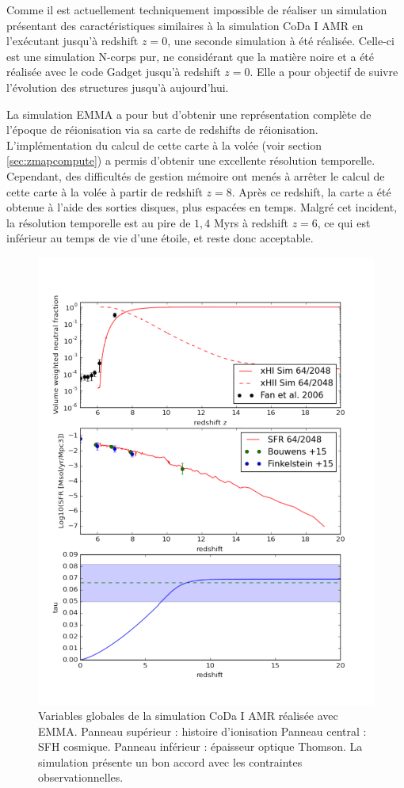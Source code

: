 Comme il est actuellement techniquement impossible de réaliser un simulation présentant des caractéristiques similaires à la simulation \ac{CoDa} I \ac{AMR} en l'exécutant jusqu’à redshift $z=0$, une seconde simulation à été réalisée.
Celle-ci est une simulation N-corps pur, ne considérant que la matière noire et a été réalisée avec le code Gadget \citep{springel_cosmological_2005} jusqu'à redshift $z=0$.
Elle a pour objectif de suivre l'évolution des structures jusqu'à aujourd'hui.

La simulation EMMA a pour but d'obtenir une représentation complète de l'époque de réionisation via sa carte de redshifts de réionisation.
L'implémentation du calcul de cette carte à la volée (voir section \ref{sec:zmapcompute}) a permis d'obtenir une excellente résolution temporelle.
Cependant, des difficultés de gestion mémoire ont menés à arrêter le calcul de cette carte à la volée à partir de redshift $z=8$.
Après ce redshift, la carte a été obtenue à l'aide des sorties disques, plus espacées en temps.
Malgré cet incident, la résolution temporelle est au pire de $1,4$ Myrs à redshift $z=6$, ce qui est inférieur au temps de vie d'une étoile, et reste donc acceptable.


\begin{figure}
        \includegraphics[width=.95\linewidth]{img/05/x_sfr_tau.pdf} 
        \caption[Contraintes CoDa I AMR]{ Variables globales de la simulation \ac{CoDa} I \ac{AMR} réalisée avec EMMA.
        Panneau supérieur : histoire d'ionisation
		Panneau central : SFH cosmique.
        Panneau inférieur : épaisseur optique Thomson.
        La simulation présente un bon accord avec les contraintes observationnelles.
		\label{fig:presCODAEMMA}}
\end{figure}



